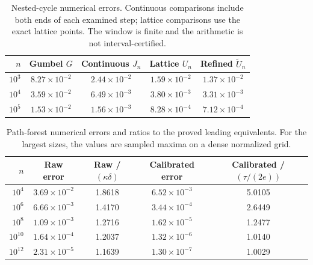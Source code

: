 \begin{table}[htbp]
\centering
\small
\caption{Nested-cycle numerical errors. Continuous comparisons include both ends of each examined step; lattice comparisons use the exact lattice points. The window is finite and the arithmetic is not interval-certified.}
\label{tab:nested-errors}
\begin{tabular}{rcccc}
\toprule
$n$ & Gumbel $G$ & Continuous $J_n$ & Lattice $U_n$ & Refined $\widetilde U_n$\\
\midrule
\(10^{3}\) & \(8.27\times10^{-2}\) & \(2.44\times10^{-2}\) & \(1.59\times10^{-2}\) & \(1.37\times10^{-2}\)\\
\(10^{4}\) & \(3.59\times10^{-2}\) & \(6.49\times10^{-3}\) & \(3.80\times10^{-3}\) & \(3.31\times10^{-3}\)\\
\(10^{5}\) & \(1.53\times10^{-2}\) & \(1.56\times10^{-3}\) & \(8.28\times10^{-4}\) & \(7.12\times10^{-4}\)\\
\bottomrule
\end{tabular}
\end{table}
\begin{table}[htbp]
\centering
\small
\caption{Path-forest numerical errors and ratios to the proved leading equivalents. For the largest sizes, the values are sampled maxima on a dense normalized grid.}
\label{tab:forest-errors}
\begin{tabular}{rcccc}
\toprule
$n$ & Raw error & Raw / $(\kappa\delta)$ & Calibrated error & Calibrated / $(\tau/(2e))$\\
\midrule
\(10^{4}\) & \(3.69\times10^{-2}\) & 1.8618 & \(6.52\times10^{-3}\) & 5.0105\\
\(10^{6}\) & \(6.66\times10^{-3}\) & 1.4170 & \(3.44\times10^{-4}\) & 2.6449\\
\(10^{8}\) & \(1.09\times10^{-3}\) & 1.2716 & \(1.62\times10^{-5}\) & 1.2477\\
\(10^{10}\) & \(1.64\times10^{-4}\) & 1.2037 & \(1.32\times10^{-6}\) & 1.0140\\
\(10^{12}\) & \(2.31\times10^{-5}\) & 1.1639 & \(1.30\times10^{-7}\) & 1.0029\\
\bottomrule
\end{tabular}
\end{table}
